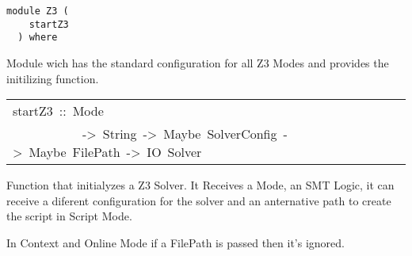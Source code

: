 \label{module:Z3}
\haddockbeginheader
{\haddockverb\begin{verbatim}
module Z3 (
    startZ3
  ) where\end{verbatim}}
\haddockendheader

Module wich has the standard configuration for all Z3 Modes and
  provides the initilizing function.
\par

\begin{haddockdesc}
\item[\begin{tabular}{@{}l}
startZ3\ ::\ Mode\\\ \ \ \ \ \ \ \ \ \ \ ->\ String\ ->\ Maybe\ SolverConfig\ ->\ Maybe\ FilePath\ ->\ IO\ Solver
\end{tabular}]\haddockbegindoc
Function that initialyzes a Z3 Solver.
  It Receives a Mode, an SMT Logic, it can receive a diferent configuration
  for the solver and an anternative path to create the script in Script Mode.
\par
In Context and Online Mode if a FilePath is passed then it's ignored.
\par

\end{haddockdesc}